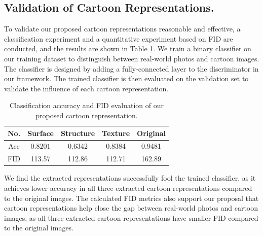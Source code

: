 \documentclass[10pt,twocolumn,letterpaper]{article}
\begin{document}
\vspace{-0.3em}
\subsection{Validation of Cartoon Representations.} 
\vspace{-0.3em}
To validate our proposed cartoon representations reasonable and effective, a classification experiment and a quantitative experiment based on FID are conducted, and the results are shown in Table \ref{table:prior}. We train a binary classifier on our training dataset to distinguish between real-world photos and cartoon images. The classifier is designed by adding a fully-connected layer to the discriminator in our framework. The trained classifier is then evaluated on the validation set to validate the influence of each cartoon representation. 

\begin{table}[t]
\centering
\begin{tabular}{ccccc}
\hline
{No.}&{Surface}&{Structure}&{Texture}&{Original}\\
\hline  
{Acc}&{$0.8201$}&{0.6342}&{0.8384}&{0.9481}\\
\hline 
{FID}&{113.57}&{112.86}&{112.71}&{162.89}\\
\hline
\end{tabular}
\caption{Classification accuracy and FID evaluation of our proposed cartoon representation.}
\label{table:prior}
\vspace{-1em}
\end{table}

We find the extracted representations successfully fool the trained classifier, as it achieves lower accuracy in all three extracted cartoon representations compared to the original images. The calculated FID metrics also support our proposal that cartoon representations help close the gap between real-world photos and cartoon images, as all three extracted cartoon representations have smaller FID compared to the original images. 
\end{document}
